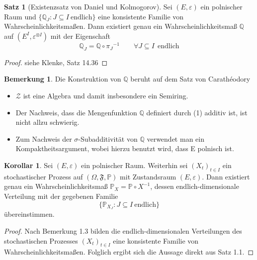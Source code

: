 \documentclass[a4paper,12pt]{scrartcl}
\theoremstyle{definition}
\newtheorem{bem}{Bemerkung}[section]
\newtheorem{sat}{Satz}[section]
\newtheorem{kol}{Korollar}[section]
\begin{document}
\begin{sat}[Existenzsatz von Daniel und Kolmogorov]
\label{Existenzsatz von Daniel und Kolmogorov}
Sei $(E, \varepsilon)$ ein polnischer Raum und $\lbrace \mathbb{Q}_{J} : J \subseteq I \: \mathrm{endlich}\rbrace$ eine konsistente Familie von Wahrscheinlichkeitsmaßen. Dann existiert genau ein Wahrscheinlichkeitsmaß $\mathbb{Q}$ auf $(E^{I},\varepsilon^{ \otimes I})$ mit der Eigenschaft
\begin{equation}
{\mathbb{Q}}_{J} = \mathbb{Q} \circ {\pi_{J}}^{-1} \qquad \forall J \subseteq I \: \: \mathrm{endlich}
\label{eins}
\end{equation}
\end{sat}
\begin{proof}
siehe Klenke, Satz 14.36
\end{proof}
\begin{bem}
Die Konstruktion von $\mathbb{Q}$ beruht auf dem Satz von Carathéodory
\begin{itemize}
\item $\mathcal{Z}$ ist eine Algebra und damit insbesondere ein Semiring. 
\item Der Nachweis, dass die Mengenfunktion $\mathbb{Q}$ definiert durch (1) additiv ist, ist nicht allzu schwierig.
\item Zum Nachweis der $\sigma$-Subadditivität von $\mathbb{Q}$ verwendet man ein Kompaktheitsargument, wobei hierzu benutzt wird, dass E polnisch ist.
\end{itemize}
\begin{kol}
Sei $(E,\varepsilon)$ ein polnischer Raum. Weiterhin sei $(X_{t})_{t\in I}$ ein stochastischer Prozess auf $(\Omega, \mathfrak{F}, \mathbb{P})$ mit Zustandsraum $(E,\varepsilon)$. Dann existiert genau ein Wahrscheinlichkeitsmaß ${\mathbb{P}}_{X} = \mathbb{P} \circ {X}^{-1}$, dessen endlich-dimensionale Verteilung mit der gegebenen Familie 
\begin{equation*}
\lbrace \mathbb{P}_{X_{J}} : J \subseteq I \: \mathrm{endlich} \rbrace
\end{equation*} 
übereinstimmen.
\end{kol}
\begin{proof}
Nach Bemerkung 1.3 bilden die endlich-dimensionalen Verteilungen des stochastischen Prozesses $(X_{t})_{t\in I}$ eine konsistente Familie von Wahrscheinlichkeitsmaßen. Folglich ergibt sich die Aussage direkt aus Satz 1.1.
\end{proof}
\end{bem}
\end{document}
